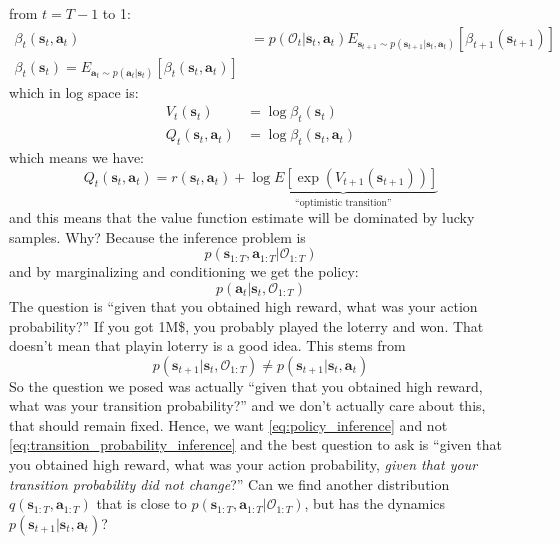 \documentclass{report}
\begin{document}
from $ t = T -1  $ to 1:
\begin{align}
		\beta_{ t } (\bm{s}_{t}, \bm{a}_{t} ) &= p (\mathcal{O}_{ t } | \bm{s}_{t}, \bm{a}_{t}) 
		E_{ \bm{s}_{t+1} \sim p (\bm{s}_{t+1}| \bm{s}_{t}, \bm{a}_{t}) } \left[ \beta_{ t+1 } (\bm{s}_{t+1}) \right] \\
		\beta_{ t } (\bm{s}_{t}) = E_{ \bm{a}_{t} \sim p (\bm{a}_{t}| \bm{s}_{t} ) } \left[ \beta_{ t }(\bm{s}_{t}, \bm{a}_{t} ) \right] 
\end{align}
which in log space is:
\begin{align}
		V_{ t } (\bm{s}_{t}) &= \log \beta_{ t } (\bm{s}_{t}) \\
		Q_{ t } (\bm{s}_{t}, \bm{a}_{t} ) &= \log \beta_{ t }(\bm{s}_{t}, \bm{a}_{t} )
\end{align}
which means we have:
\begin{equation}
		Q_{ t }(\bm{s}_{t}, \bm{a}_{t} ) = r(\bm{s}_{t}, \bm{a}_{t} ) + 
		\underbrace{\log E \left[ \exp (V_{ t+1 } (\bm{s}_{t+1})) \right] }_{ \text{``optimistic transition''} }
\end{equation}
and this means that the value function estimate will be dominated by lucky samples.
Why? Because the inference problem is
\begin{equation}
		p (\bm{s}_{1:T}, \bm{a}_{1:T}| \mathcal{O}_{ 1:T })
\end{equation}
and by marginalizing and conditioning we get the policy:
\begin{equation}
		\label{eq:policy_inference}
		p (\bm{a}_{t}| \bm{s}_{t}, \mathcal{O}_{ 1:T })
\end{equation}
The question is ``given that you obtained high reward, what was your action probability?''
If you got 1M\$, you probably played the loterry and won. That doesn't mean that playin loterry is a good idea.
This stems from 
\begin{equation}
		\label{eq:transition_probability_inference}
		p (\bm{s}_{t+1}| \bm{s}_{t}, \mathcal{O}_{ 1:T }) \neq p (\bm{s}_{t+1}| \bm{s}_{t}, \bm{a}_{t} )
\end{equation}
So the question we posed was actually ``given that you obtained high reward, what was your transition probability?'' and
we don't actually care about this, that should remain fixed.
Hence, we want \ref{eq:policy_inference} and not \ref{eq:transition_probability_inference}
and the best question to ask is
``given that you obtained high reward, what was your action probability, \textit{given that your transition probability did not change}?''
Can we find another distribution $ q (\bm{s}_{1:T}, \bm{a}_{1:T})  $ that is close to $ p (\bm{s}_{1:T}, \bm{a}_{1:T}|\mathcal{O}_{ 1:T })  $,
but has the dynamics $ p (\bm{s}_{t+1}|\bm{s}_{t}, \bm{a}_{t})  $?
\end{document}
